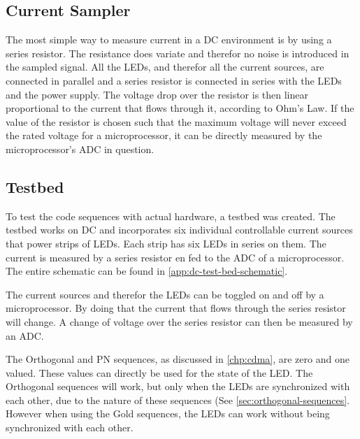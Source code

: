 








\subsection{Current Sampler}

The most simple way to measure current in a DC environment is by using a series resistor.
The resistance does variate and therefor no noise is introduced in the sampled signal.
All the LEDs, and therefor all the current sources, are connected in parallel and a series resistor is connected in series with the LEDs and the power supply.
The voltage drop over the resistor is then linear proportional to the current that flows through it, according to Ohm's Law.
If the value of the resistor is chosen such that the maximum voltage will never exceed the rated voltage for a microprocessor, it can be directly measured by the microprocessor's ADC in question.









\subsection{Testbed}
\label{subsec:dc-testbed}

To test the code sequences with actual hardware, a testbed was created.
The testbed works on DC and incorporates six individual controllable current sources that power strips of LEDs.
Each strip has six LEDs in series on them.
The current is measured by a series resistor en fed to the ADC of a microprocessor.
The entire schematic can be found in \autoref{app:dc-test-bed-schematic}. 



The current sources and therefor the LEDs can be toggled on and off by a microprocessor.
By doing that the current that flows through the series resistor will change.
A change of voltage over the series resistor can then be measured by an ADC.


The Orthogonal and PN sequences, as discussed in \autoref{chp:cdma}, are zero and one valued.
These values can directly be used for the state of the LED.
The Orthogonal sequences will work, but only when the LEDs are synchronized with each other, due to the nature of these sequences (See \autoref{sec:orthogonal-sequences}.
However when using the Gold sequences, the LEDs can work without being synchronized with each other.
















